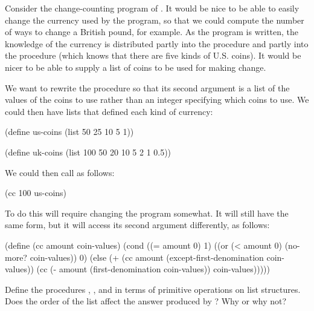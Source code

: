 \begin{exercise}
	\label{Exercise 2.19}
	Consider the change-counting program of .
	It would be nice to be able to easily change the currency used by the program, so that we could compute the number of ways to change a British pound, for example.
	As the program is written, the knowledge of the currency is distributed partly into the procedure  and partly into the procedure  (which knows that there are five kinds of U.S. coins).
	It would be nicer to be able to supply a list of coins to be used for making change.

	We want to rewrite the procedure  so that its second argument is a list of the values of the coins to use rather than an integer specifying which coins to use.
	We could then have lists that defined each kind of currency:
	\begin{scheme}
	  (define us-coins (list 50 25 10 5 1))

	  (define uk-coins (list 100 50 20 10 5 2 1 0.5))
	\end{scheme}
	We could then call  as follows:
	\begin{scheme}
	  (cc 100 us-coins)
	  ~~
	\end{scheme}
	To do this will require changing the program  somewhat.
	It will still have the same form, but it will access its second argument differently, as follows:
	\begin{scheme}
	  (define (cc amount coin-values)
	    (cond ((= amount 0) 1)
	          ((or (< amount 0) (no-more? coin-values)) 0)
	          (else
	           (+ (cc amount
	                  (except-first-denomination
	                   coin-values))
	              (cc (- amount
	                     (first-denomination
	                      coin-values))
	                  coin-values)))))
	\end{scheme}
	Define the procedures , , and  in terms of primitive operations on list structures.
	Does the order of the list  affect the answer produced by ?
	Why or why not?
\end{exercise}



